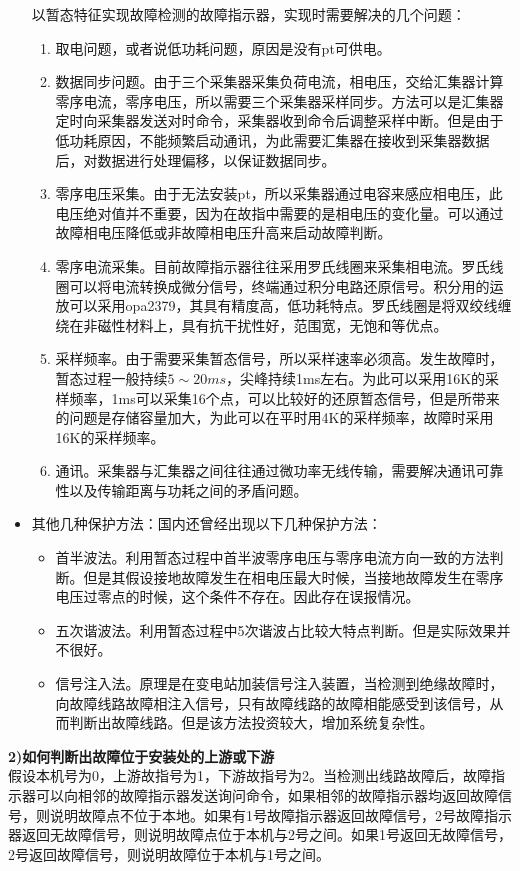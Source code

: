 \documentclass{article}
\begin{document}
\begin{CJK}{UTF8}{gbsn}
\begin{itemize}
				以暂态特征实现故障检测的故障指示器，实现时需要解决的几个问题：
				\begin{enumerate}
				\item  取电问题，或者说低功耗问题，原因是没有pt可供电。
				\item  数据同步问题。由于三个采集器采集负荷电流，相电压，交给汇集器计算零序电流，零序电压，所以需要三个采集器采样同步。方法可以是汇集器定时向采集器发送对时命令，采集器收到命令后调整采样中断。但是由于低功耗原因，不能频繁启动通讯，为此需要汇集器在接收到采集器数据后，对数据进行处理偏移，以保证数据同步。
				\item 零序电压采集。由于无法安装pt，所以采集器通过电容来感应相电压，此电压绝对值并不重要，因为在故指中需要的是相电压的变化量。可以通过故障相电压降低或非故障相电压升高来启动故障判断。
				\item 零序电流采集。目前故障指示器往往采用罗氏线圈来采集相电流。罗氏线圈可以将电流转换成微分信号，终端通过积分电路还原信号。积分用的运放可以采用opa2379，其具有精度高，低功耗特点。罗氏线圈是将双绞线缠绕在非磁性材料上，具有抗干扰性好，范围宽，无饱和等优点。
				\item 采样频率。由于需要采集暂态信号，所以采样速率必须高。发生故障时，暂态过程一般持续$5\sim 20ms$，尖峰持续1ms左右。为此可以采用16K的采样频率，1ms可以采集16个点，可以比较好的还原暂态信号，但是所带来的问题是存储容量加大，为此可以在平时用4K的采样频率，故障时采用16K的采样频率。
				\item  通讯。采集器与汇集器之间往往通过微功率无线传输，需要解决通讯可靠性以及传输距离与功耗之间的矛盾问题。
			\end{enumerate}
		\item 其他几种保护方法：国内还曾经出现以下几种保护方法：\cite{p2}
			\begin{itemize}
					\item 首半波法。利用暂态过程中首半波零序电压与零序电流方向一致的方法判断。但是其假设接地故障发生在相电压最大时候，当接地故障发生在零序电压过零点的时候，这个条件不存在。因此存在误报情况。
					\item 五次谐波法。利用暂态过程中5次谐波占比较大特点判断。但是实际效果并不很好。
					\item 信号注入法。原理是在变电站加装信号注入装置，当检测到绝缘故障时，向故障线路故障相注入信号，只有故障线路的故障相能感受到该信号，从而判断出故障线路。但是该方法投资较大，增加系统复杂性。
			\end{itemize}
	\end{itemize}
	\textbf{2)如何判断出故障位于安装处的上游或下游}\\
			假设本机号为0，上游故指号为1，下游故指号为2。当检测出线路故障后，故障指示器可以向相邻的故障指示器发送询问命令，如果相邻的故障指示器均返回故障信号，则说明故障点不位于本地。如果有1号故障指示器返回故障信号，2号故障指示器返回无故障信号，则说明故障点位于本机与2号之间。如果1号返回无故障信号，2号返回故障信号，则说明故障位于本机与1号之间。\\

\end{CJK}
\end{document}
